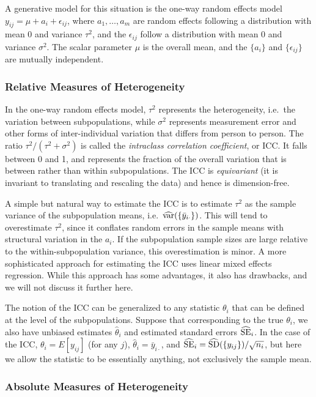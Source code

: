 A generative model for this situation is the one-way random effects model $y_{ij} = \mu + a_i + \epsilon_{ij}$, where $a_1, \ldots, a_m$ are random effects following a distribution with mean $0$ and variance $\tau^2$, and the $\epsilon_{ij}$ follow a distribution with mean $0$ and variance $\sigma^2$. The scalar parameter $\mu$ is the overall mean, and the $\{a_i\}$ and $\{\epsilon_{ij}\}$ are mutually independent.

\subsubsection{Relative Measures of Heterogeneity}

In the one-way random effects model, $\tau^2$ represents the heterogeneity, i.e.\ the variation between subpopulations, while $\sigma^2$ represents measurement error and other forms of inter-individual variation that differs from person to person. The ratio $\tau^2 / (\tau^2 + \sigma^2)$ is called the \textit{intraclass correlation coefficient}, or ICC. It falls between 0 and 1, and represents the fraction of the overall variation that is between rather than within subpopulations. The ICC is {\em equivariant} (it is invariant to translating and rescaling the data) and hence is dimension-free.

A simple but natural way to estimate the ICC is to estimate $\tau^2$ as the sample variance of the subpopulation means, i.e.\ $\widehat{\rm var}(\{\bar{y}_{i\cdot}\})$. This will tend to overestimate $\tau^2$, since it conflates random errors in the sample means with structural variation in the $a_i$. If the subpopulation sample sizes are large relative to the within-subpopulation variance, this overestimation is minor. A more sophisticated approach for estimating the ICC uses linear mixed effects regression. While this approach has some advantages, it also has drawbacks, and we will not discuss it further here.

The notion of the ICC can be generalized to any statistic $\theta_i$ that can be defined at the level of the subpopulations. Suppose that corresponding to the true $\theta_i$, we also have unbiased estimates $\hat{\theta}_i$ and estimated standard errors $\widehat{\rm SE}_i$. In the case of the ICC, $\theta_i = E[y_{ij}]$ (for any $j$), $\hat{\theta}_i = \bar{y}_{i\cdot}$, and $\widehat{\rm SE}_i = \widehat{\rm SD}(\{y_{ij}\})/\sqrt{n_i}$, but here we allow the statistic to be essentially anything, not exclusively the sample mean.

\subsubsection{Absolute Measures of Heterogeneity}

